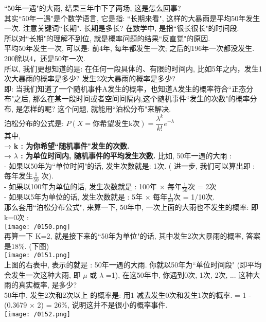 \documentclass[UTF8]{ctexart}
\begin{document}
	
	
	\begin{myEnvSample}
		``50年一遇"的大雨, 结果三年中下了两场, 这是怎么回事? \\
		其实``50年一遇"是个数学语言, 它是指: ``长期来看", 这样的大暴雨是平均50年发生一次. 注意关键词``长期". 长期是多长? 在数学中, 是指``很长很长"的时间段. \\
		所以对``长期"的理解不到位, 就是概率问题的结果``反直觉"的原因. \\
		
		平均50年发生一次, 可以是:  前4年, 每年都发生一次; 之后的196年一次都没发生. 200除以4，还是50年一次. \\
		
		所以, 我们更想知道的是: 在任何一段具体的、有限的时间内, 比如5年之内，发生1次大暴雨的概率是多少? 发生2次大暴雨的概率是多少? \\
		
		即: 当我们知道了一个随机事件A发生的概率，也知道A发生的概率符合``正态分布"之后, 那么在某一段时间或者空间间隔内,这个随机事件``发生的次数"的概率分布, 是怎样的呢? 这个问题, 就能用``泊松分布"来解决. \\
		
		泊松分布的公式是: 	$ \boxed{
		P(X=\text{你希望发生k次})=\dfrac{\lambda^k} {k!} e^{-\lambda}}$	 \\
		其中, \\
		→ \textbf{k : 为你希望``随机事件"发生的次数.} \\
		→ \textbf{$\lambda$ : 为单位时间内, 随机事件的平均发生次数.} 比如, 50年一遇的大雨 : \\
		- 如果以50年为``单位时间"的话, 发生次数就是: 1次.  ( 进一步, 我们可以算出即 : 每年发生$\frac{1} {50}$ 次).  \\
		- 如果以100年为单位的话, 发生次数就是 : 100年 ×  每年$\frac{1} {50}$次 = 2次  \\
		- 如果以5年为单位的话, 发生次数就是 :  5年 ×  每年$\frac{1} {50}$次 = 1/10次. \\ 
		
		那么套用``泊松分布公式", 来算一下, 50年中, 一次上面的大雨也不发生的概率: 即 k=0次 : \\
		
		\texttt{[image: /0150.png]} \\
		
		再算一下 K=2, 就是接下来的``50年为单位"的话, 其中发生2次大暴雨的概率, 答案是18\%. (下图) \\
		
		\texttt{[image: /0151.png]} \\	
		
		上图的右表中, 表示的就是 :  50年一遇的大雨. 你就以50年为``单位时间段" (即平均会发生一次这种大雨, 即 $\mu$ 或 $\lambda$ =1), 在这50年中, 你遇到0次, 1次, 2次, ...​ 这种大雨的真实概率, 是多少? \\
		
		50年中, 发生2次和2次以上 的概率是: 用1 减去发生0次和发生1次的概率. = 1 - (0.3679 × 2) = 26\%, 说明这并不是很小的概率事件. \\
		
		\texttt{[image: /0152.png]} 
	\end{myEnvSample}
\end{document}
